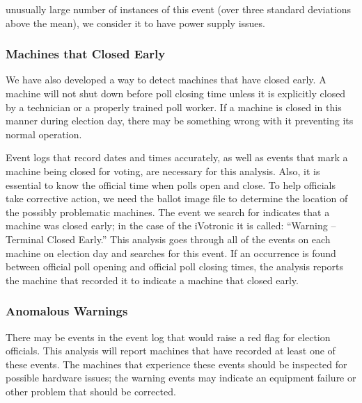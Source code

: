 unusually large number of instances of this event (over three standard deviations above the mean), we consider it to have power supply issues.    

\subsubsection{Machines that Closed Early}
We have also developed a way to detect machines that have closed early. A machine will not shut down before poll closing time unless it is explicitly closed by a technician or a properly trained poll worker. If a machine is closed in this manner during election day, there may be something wrong with it preventing its normal operation.
                  
Event logs that record dates and times accurately, as well as events
that mark a machine being closed for voting, are necessary for this
analysis. Also, it is essential to know the official time when polls
open and close. To help officials take corrective action, we need the
ballot image file to determine the location of the possibly
problematic machines. The event we search for indicates that a machine
was closed early; in the case of the iVotronic it is called:
\textquotedblleft Warning -- Terminal Closed
Early.\textquotedblright \hspace{2 mm} This analysis goes through all
of the events on each machine on election day and searches for this
event. If an occurrence is found between official poll opening and
official poll closing times, the analysis reports the machine that
recorded it to indicate a machine that closed early.  

        
\subsubsection{Anomalous Warnings}
There may be events in the event log that would raise a red flag for election officials. This analysis will report machines that have recorded at least one of these events. The machines that experience these events should be inspected for possible hardware issues; the warning events may indicate an equipment failure or other problem that should be corrected.

